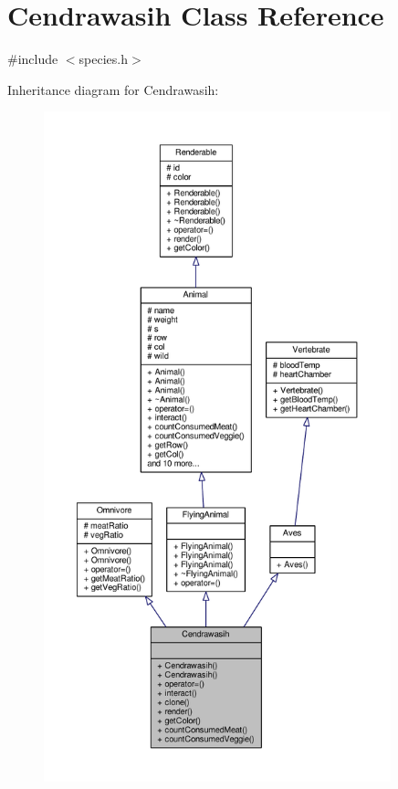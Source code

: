 \hypertarget{classCendrawasih}{}\section{Cendrawasih Class Reference}
\label{classCendrawasih}


{\ttfamily \#include $<$species.\+h$>$}



Inheritance diagram for Cendrawasih\+:
\nopagebreak
\begin{figure}[H]
\begin{center}
\leavevmode
\includegraphics[height=550pt]{classCendrawasih__inherit__graph}
\end{center}
\end{figure}


